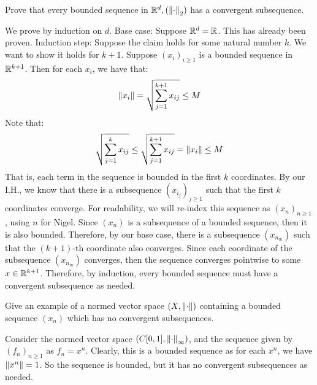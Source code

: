 \newpage
\label{q10}
\begin{qu}[title=Bolzano-Weierstrass Theorem,num=10.1]
    Prove that every bounded sequence in $ \mathbb{R}^{d}, (\left\|\cdot\right\|_{2}) $ has
    a convergent subsequence.
\end{qu}

\begin{soln}
    We prove by induction on $ d $. \vsp
    Base case: Suppose $ \mathbb{R}^{d} = \mathbb{R} $. This has already been proven.
    \vsp
    Induction step: Suppose the claim holds for some natural number $ k $.
    We want to show it holds for $ k + 1 $. \vsp
    Suppose $ (x_{i})_{i \geq 1} $ is a bounded sequence in $ \mathbb{R}^{k+1} $.
    Then for each $ x_{i} $, we have that:
    \begin{equation*}
        \left\|x_{i}\right\| = \sqrt{\sum_{j=1}^{k+1} x_{ij}} \leq M
    \end{equation*}
    Note that:
    \begin{equation*}
        \sqrt{\sum_{j=1}^{k} x_{ij}} \leq \sqrt{\sum_{j=1}^{k+1}x_{ij}}
        = \left\|x_{i}\right\| \leq M
    \end{equation*}
    That is, each term in the sequence is bounded in the first $ k $ coordinates.
    \vsp
    By our I.H., we know that there is a subsequence $ (x_{i_{j}})_{j \geq 1} $
    such that the first $ k $ coordinates converge. For readability, we will
    re-index this sequence as $ (x_{n})_{n\geq1} $, using $ n $ for Nigel. \vsp
    Since $ (x_{n}) $ is a subsequence of a bounded sequence, then it is also
    bounded. Therefore, by our base case, there is a subsequence $ (x_{n_{m}}) $
    such that the $ (k+1) $-th coordinate also converges. \vsp
    Since each coordinate of the subsequence $ (x_{n_{m}}) $ converges, then
    the sequence converges pointwise to some $ x \in \mathbb{R}^{k+1} $.
    Therefore, by induction, every bounded sequence must have a convergent
    subsequence as needed.
\end{soln}

\begin{qu}[num=10.2]
    Give an example of a normed vector space $(X, \left\|\cdot\right\|)$ containing a
    bounded sequence $(x_n)$ which has no convergent subsequences.
\end{qu}

\begin{soln}
    Consider the normed vector space $ (C[0, 1], \left\|\cdot\right\|_{\infty}) $, and
    the sequence given by $ (f_{n})_{n \geq 1} $ as $ f_{n} = x^{n} $. \vsp
    Clearly, this is a bounded sequence as for each $ x^{n} $, we have
    $ \left\|x^{n}\right\| = 1 $. So the sequence is bounded, but it has no convergent
    subsequences as needed.
\end{soln}


